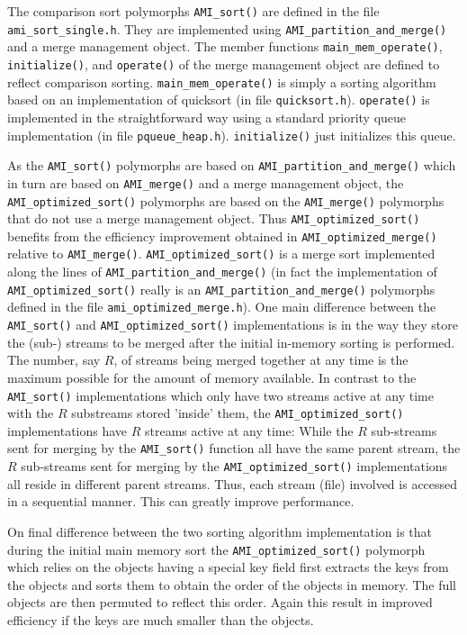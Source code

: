 \tobeextended

The comparison sort polymorphs \verb|AMI_sort()| are defined in the file
\verb|ami_sort_single.h|. They are implemented using
\verb|AMI_partition_and_merge()| and a merge management object. The member
functions \verb|main_mem_operate()|, \verb|initialize()|, and
\verb|operate()| of the merge management object are defined to reflect
comparison sorting. \verb|main_mem_operate()| is simply a sorting algorithm
based on an implementation of quicksort (in file
\verb|quicksort.h|). \verb|operate()| is implemented in the straightforward
way using a standard priority queue implementation (in file
\verb|pqueue_heap.h|). \verb|initialize()| just initializes this
queue.

As the \verb|AMI_sort()| polymorphs are based on
\verb|AMI_partition_and_merge()| which in turn are based on
\verb|AMI_merge()| and a merge management object, the
\verb|AMI_optimized_sort()| polymorphs are based on the \verb|AMI_merge()|
polymorphs that do not use a merge management object. Thus
\verb|AMI_optimized_sort()| benefits from the efficiency improvement
obtained in \verb|AMI_optimized_merge()| relative to
\verb|AMI_merge()|. \verb|AMI_optimized_sort()| is a merge sort implemented
along the lines of \verb|AMI_partition_and_merge()| (in fact the
implementation of \verb|AMI_optimized_sort()| really is an
\verb|AMI_partition_and_merge()| polymorphs defined in the file
\verb|ami_optimized_merge.h|). One main difference between the
\verb|AMI_sort()| and \verb|AMI_optimized_sort()| implementations is in the
way they store the (sub-) streams to be merged after the initial in-memory
sorting is performed. The number, say $R$, of streams being merged together
at any time is the maximum possible for the amount of memory available. In
contrast to the \verb|AMI_sort()| implementations which only have two
streams active at any time with the $R$ substreams stored 'inside' them,
the \verb|AMI_optimized_sort()| implementations have $R$ streams active at
any time: While the $R$ sub-streams sent for merging by the
\verb|AMI_sort()| function all have the same parent stream, the $R$
sub-streams sent for merging by the \verb|AMI_optimized_sort()|
implementations all reside in different parent streams. Thus, each stream
(file) involved is accessed in a sequential manner. This can greatly
improve performance.

On final difference between the two sorting algorithm implementation is
that during the initial main memory sort the \verb|AMI_optimized_sort()|
polymorph which relies on the objects having a special key field first
extracts the keys from the objects and sorts them to obtain the order of
the objects in memory. The full objects are then permuted to reflect this
order. Again this result in improved efficiency if the keys are much
smaller than the objects.

